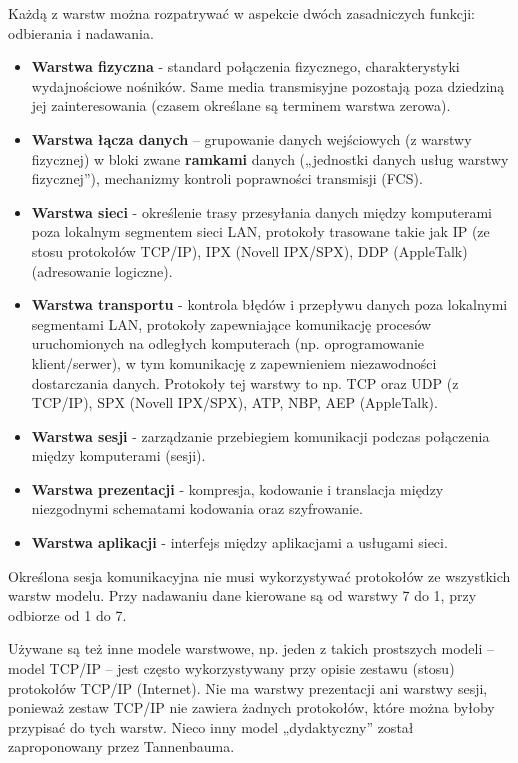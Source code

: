 \documentclass[../main.tex]{subfiles}
\begin{document}
    Każdą z warstw można rozpatrywać w aspekcie dwóch zasadniczych funkcji: odbierania i
    nadawania.
    \begin{itemize}
        \item \textbf{Warstwa fizyczna} - standard połączenia fizycznego, charakterystyki wydajnościowe nośników. Same media transmisyjne pozostają poza dziedziną jej
        zainteresowania (czasem określane są terminem warstwa zerowa).
        \item \textbf{Warstwa łącza danych} – grupowanie danych wejściowych (z warstwy fizycznej) w bloki zwane \textbf{ramkami} danych („jednostki
        danych usług warstwy fizycznej”), mechanizmy kontroli poprawności
        transmisji (FCS).
        \item \textbf{Warstwa sieci} - określenie trasy przesyłania
        danych między komputerami poza lokalnym segmentem sieci LAN, protokoły trasowane takie jak IP (ze stosu protokołów TCP/IP), IPX
        (Novell IPX/SPX), DDP (AppleTalk) (adresowanie logiczne).
        \item \textbf{Warstwa transportu} - kontrola błędów i przepływu danych
        poza lokalnymi segmentami LAN, protokoły zapewniające
        komunikację procesów uruchomionych na odległych komputerach (np. oprogramowanie klient/serwer), w tym komunikację z zapewnieniem
        niezawodności dostarczania danych. Protokoły tej warstwy to np. TCP oraz UDP (z
        TCP/IP), SPX (Novell IPX/SPX), ATP, NBP, AEP (AppleTalk).
        \item \textbf{Warstwa sesji} - zarządzanie przebiegiem komunikacji podczas
        połączenia między komputerami (sesji).
        \item \textbf{Warstwa prezentacji} - kompresja, kodowanie i
        translacja między niezgodnymi schematami kodowania oraz szyfrowanie.
        \item \textbf{Warstwa aplikacji} - interfejs między aplikacjami a
        usługami sieci.
    \end{itemize}

    Określona sesja komunikacyjna nie musi wykorzystywać protokołów ze wszystkich warstw
    modelu. Przy nadawaniu dane kierowane są od warstwy 7 do 1, przy odbiorze od 1 do 7.

    Używane są też inne modele warstwowe, np. jeden z takich
    prostszych modeli – model TCP/IP – jest często wykorzystywany przy opisie zestawu (stosu)
    protokołów TCP/IP (Internet). Nie ma warstwy prezentacji ani warstwy sesji, ponieważ zestaw TCP/IP nie zawiera
    żadnych protokołów, które można byłoby przypisać do tych warstw. Nieco inny model
    „dydaktyczny” został zaproponowany przez Tannenbauma.
\end{document}
